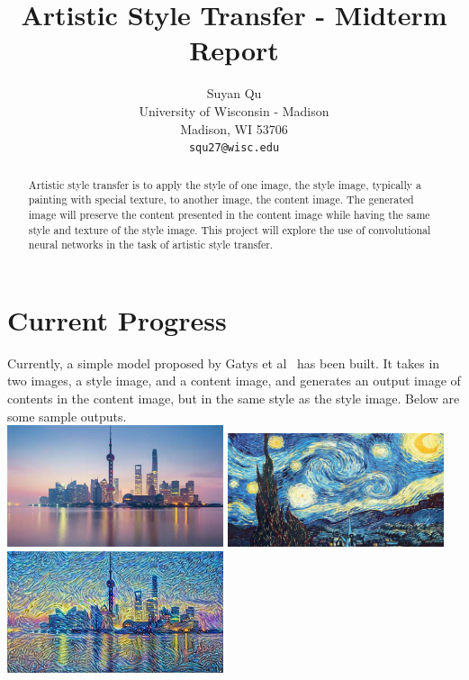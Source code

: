 \documentclass[10pt,twocolumn,letterpaper]{article}
\begin{document}
\title{Artistic Style Transfer - Midterm Report}

\author{Suyan Qu\\
University of Wisconsin - Madison\\
Madison, WI 53706\\
{\tt\small squ27@wisc.edu}
}

\maketitle

\begin{abstract}
   Artistic style transfer is to apply the style of one image, the style image, typically a painting with special texture, to another image, the content image. The generated image will preserve the content presented in the content image while having the same style and texture of the style image. This project will explore the use of convolutional neural networks in the task of artistic style transfer. 
\end{abstract}

\section{Current Progress}
Currently, a simple model proposed by Gatys et al~\cite{Gatys} has been built. It takes in two images, a style image, and a content image, and generates an output image of contents in the content image, but in the same style as the style image. Below are some sample outputs. \\
\includegraphics[width = 240px]{city1.jpg} \includegraphics[width = 240px]{starry_night.jpg} \includegraphics[width = 240px]{shanghai_styled.jpg}\\
\end{document}
